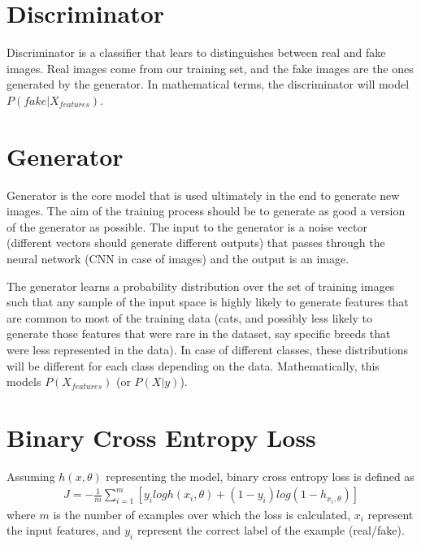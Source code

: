 \documentclass[../gan.tex]{subfiles}
\begin{document}
\section{Discriminator}
Discriminator is a classifier that lears to distinguishes between real and fake images. Real images come from our training set, and the fake images are the ones generated by the generator. In mathematical terms, the discriminator will model $P(fake | X_{features})$.

\section{Generator}
Generator is the core model that is used ultimately in the end to generate new images. The aim of the training process should be to generate as good a version of the generator as possible. The input to the generator is a noise vector (different vectors should generate different outputs) that passes through the neural network (CNN in case of images) and the output is an image.

The generator learns a probability distribution over the set of training images such that any sample of the input space is highly likely to generate features that are common to most of the training data (cats, and possibly less likely to generate those features that were rare in the dataset, say specific breeds that were less represented in the data). In case of different classes, these distributions will be different for each class depending on the data. Mathematically, this models $P(X_{features})$ (or $P(X|y)$).

\section{Binary Cross Entropy Loss}
Assuming $h(x, \theta)$ representing the model, binary cross entropy loss is defined as
\begin{align*}
    J = -\frac{1}{m} \sum_{i=1}^{m} [y_{i} log h(x_{i}, \theta) + (1 - y_{i})log(1 - h_{x_{i}, \theta})]
\end{align*}
where $m$ is the number of examples over which the loss is calculated, $x_{i}$ represent the input features, and $y_{i}$ represent the correct label of the example (real/fake).
\end{document}
